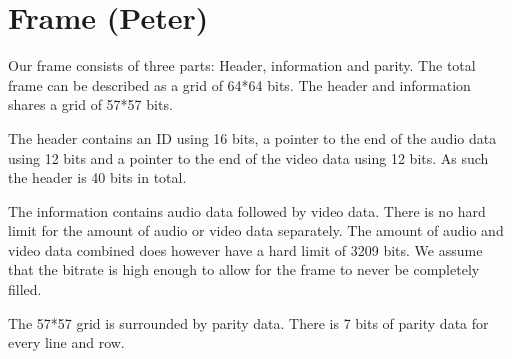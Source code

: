 \section{Frame (Peter)}
Our frame consists of three parts: Header, information and parity. The total frame can be described as a grid of 64*64 bits. The header and information shares a grid of 57*57 bits.

The header contains an ID using 16 bits, a pointer to the end of the audio data using 12 bits and a pointer to the end of the video data using 12 bits. As such the header is 40 bits in total.

The information contains audio data followed by video data. There is no hard limit for the amount of audio or video data separately. The amount of audio and video data combined does however have a hard limit of 3209 bits. We assume that the bitrate is high enough to allow for the frame to never be completely filled.

The 57*57 grid is surrounded by parity data. There is 7 bits of parity data for every line and row.
